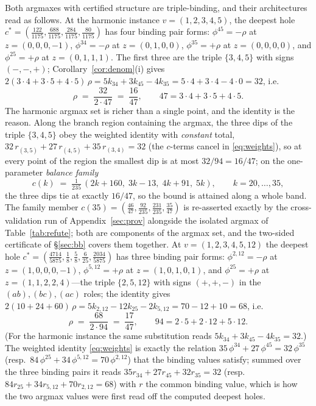 Both argmaxes with certified structure are triple-binding, and their
architectures read
as follows. At the harmonic instance $v=(1,2,3,4,5)$, the deepest hole
$c^{*}=(\tfrac{122}{1175},\tfrac{688}{1175},\tfrac{284}{1175},
\tfrac{80}{1175})$ has four binding pair forms:
$\phi^{45}=-\rho$ at $z=(0,0,0,-1)$, $\phi^{34}=-\rho$ at
$z=(0,1,0,0)$, $\phi^{35}=+\rho$ at $z=(0,0,0,0)$, and
$\phi^{25}=+\rho$ at $z=(0,1,1,1)$. The first three are the triple
$\{3,4,5\}$ with signs $(-,-,+)$; Corollary~\ref{cor:denom}(i) gives
$2(3\cdot4+3\cdot5+4\cdot5)\,\rho=5k_{34}+3k_{45}-4k_{35}
=5\cdot4+3\cdot4-4\cdot0=32$, i.e.
\[
\rho\;=\;\frac{32}{2\cdot 47}\;=\;\frac{16}{47},
\qquad 47=3\cdot4+3\cdot5+4\cdot5.
\]
The harmonic argmax set is richer than a single point, and the identity
is the reason. Along the branch region containing the argmax, the three
dips of the triple $\{3,4,5\}$ obey the weighted identity with
\emph{constant} total,
$32\,r_{(3,5)}+27\,r_{(4,5)}+35\,r_{(3,4)}=32$ (the $c$-terms cancel
in \eqref{eq:weights}), so at every point of the region the smallest
dip is at most $32/94=16/47$; on the one-parameter \emph{balance
family}
\[
c(k)\;=\;\tfrac{1}{235}\,(2k{+}160,\;3k{-}13,\;4k{+}91,\;5k),
\qquad k=20,\dots,35,
\]
the three dips tie at exactly $16/47$, so the bound is attained along a
whole band. The family member $c(35)=(\tfrac{46}{47},
\tfrac{92}{235},\tfrac{231}{235},\tfrac{35}{47})$ is re-asserted
exactly by the cross-validation run of Appendix~\ref{sec:prov}
alongside the isolated argmax of Table~\ref{tab:refute}; both are
components of the argmax set, and the two-sided certificate of
\S\ref{sec:bb} covers them together.
At $v=(1,2,3,4,5,12)$ the deepest hole
$c^{*}=(\tfrac{4714}{5875},\tfrac18,\tfrac58,\tfrac6{25},
\tfrac{2034}{5875})$ has three binding pair forms: $\phi^{2,12}=-\rho$
at $z=(1,0,0,0,-1)$, $\phi^{5,12}=+\rho$ at $z=(1,0,1,0,1)$, and
$\phi^{25}=+\rho$ at $z=(1,1,2,2,4)$---the triple $\{2,5,12\}$ with
signs $(+{,}+{,}-)$ in the $(ab),(bc),(ac)$ roles; the identity gives
$2(10+24+60)\,\rho=5k_{2,12}-12k_{25}-2k_{5,12}=70-12+10=68$, i.e.
\[
\rho\;=\;\frac{68}{2\cdot 94}\;=\;\frac{17}{47},
\qquad 94=2\cdot5+2\cdot12+5\cdot12.
\]
(For the harmonic instance the same substitution reads
$5k_{34}+3k_{45}-4k_{35}=32$.)
The weighted identity \eqref{eq:weights} is exactly the relation
$35\,\phi^{34}+27\,\phi^{45}=32\,\phi^{35}$ (resp.\
$84\,\phi^{25}+34\,\phi^{5,12}=70\,\phi^{2,12}$) that the binding
values satisfy; summed over the three binding pairs it reads
$35r_{34}+27r_{45}+32r_{35}=32$ (resp.\ $84r_{25}+34r_{5,12}+70r_{2,12}
=68$) with $r$ the common binding value, which is how the two argmax
values were first read off the computed deepest holes.

